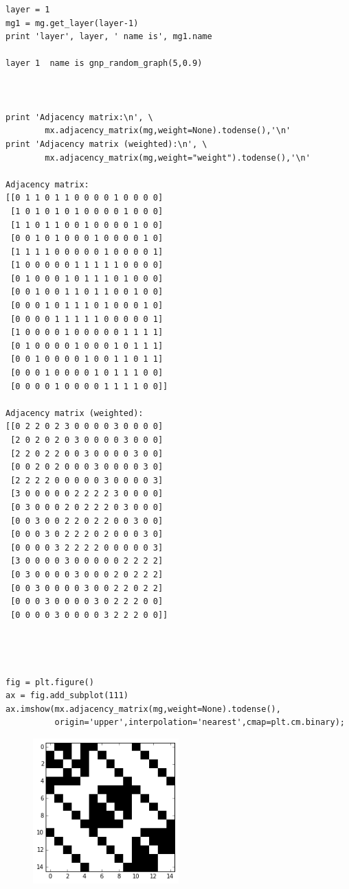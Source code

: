\documentclass[11pt]{article}
\begin{document}
\begin{verbatim}
layer = 1
mg1 = mg.get_layer(layer-1)
print 'layer', layer, ' name is', mg1.name

layer 1  name is gnp_random_graph(5,0.9)



print 'Adjacency matrix:\n', \
        mx.adjacency_matrix(mg,weight=None).todense(),'\n'
print 'Adjacency matrix (weighted):\n', \
        mx.adjacency_matrix(mg,weight="weight").todense(),'\n'

Adjacency matrix:
[[0 1 1 0 1 1 0 0 0 0 1 0 0 0 0]
 [1 0 1 0 1 0 1 0 0 0 0 1 0 0 0]
 [1 1 0 1 1 0 0 1 0 0 0 0 1 0 0]
 [0 0 1 0 1 0 0 0 1 0 0 0 0 1 0]
 [1 1 1 1 0 0 0 0 0 1 0 0 0 0 1]
 [1 0 0 0 0 0 1 1 1 1 1 0 0 0 0]
 [0 1 0 0 0 1 0 1 1 1 0 1 0 0 0]
 [0 0 1 0 0 1 1 0 1 1 0 0 1 0 0]
 [0 0 0 1 0 1 1 1 0 1 0 0 0 1 0]
 [0 0 0 0 1 1 1 1 1 0 0 0 0 0 1]
 [1 0 0 0 0 1 0 0 0 0 0 1 1 1 1]
 [0 1 0 0 0 0 1 0 0 0 1 0 1 1 1]
 [0 0 1 0 0 0 0 1 0 0 1 1 0 1 1]
 [0 0 0 1 0 0 0 0 1 0 1 1 1 0 0]
 [0 0 0 0 1 0 0 0 0 1 1 1 1 0 0]] 

Adjacency matrix (weighted):
[[0 2 2 0 2 3 0 0 0 0 3 0 0 0 0]
 [2 0 2 0 2 0 3 0 0 0 0 3 0 0 0]
 [2 2 0 2 2 0 0 3 0 0 0 0 3 0 0]
 [0 0 2 0 2 0 0 0 3 0 0 0 0 3 0]
 [2 2 2 2 0 0 0 0 0 3 0 0 0 0 3]
 [3 0 0 0 0 0 2 2 2 2 3 0 0 0 0]
 [0 3 0 0 0 2 0 2 2 2 0 3 0 0 0]
 [0 0 3 0 0 2 2 0 2 2 0 0 3 0 0]
 [0 0 0 3 0 2 2 2 0 2 0 0 0 3 0]
 [0 0 0 0 3 2 2 2 2 0 0 0 0 0 3]
 [3 0 0 0 0 3 0 0 0 0 0 2 2 2 2]
 [0 3 0 0 0 0 3 0 0 0 2 0 2 2 2]
 [0 0 3 0 0 0 0 3 0 0 2 2 0 2 2]
 [0 0 0 3 0 0 0 0 3 0 2 2 2 0 0]
 [0 0 0 0 3 0 0 0 0 3 2 2 2 0 0]] 




fig = plt.figure()
ax = fig.add_subplot(111)
ax.imshow(mx.adjacency_matrix(mg,weight=None).todense(),
          origin='upper',interpolation='nearest',cmap=plt.cm.binary);
\end{verbatim}

\begin{figure}[htbp]
\centering
\includegraphics[width=0.5\textwidth]{output_35_0.png}
\end{figure}
\end{document}
